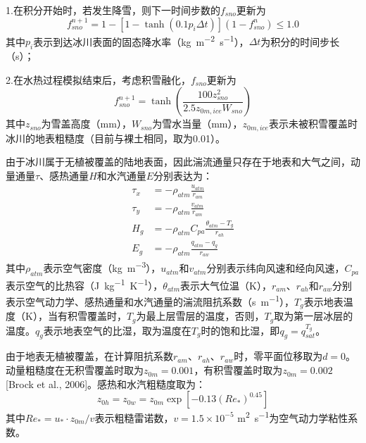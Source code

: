 1.在积分开始时，若发生降雪，则下一时间步数的$f_{sno}$更新为
\begin{equation}
    f^{n+1}_{sno}=1-\left[1-\tanh{\left(0.1 p_i \Delta t\right)}\right]\left(1-f^n_{sno}\right) \leqslant 1.0
\end{equation}
其中$p_i$表示到达冰川表面的固态降水率（\unit{kg.m^{-2}.s^{-1}}），$\Delta t$为积分的时间步长（s）；

2.在水热过程模拟结束后，考虑积雪融化，$f_{sno}$更新为
\begin{equation}
    f^{n+1}_{sno}=\tanh \left(\frac{100 z^2_{sno}}{2.5z_{0m,ice} W_{sno}}\right)
\end{equation}
其中$z_{sno}$为雪盖高度（mm），$W_{sno}$为雪水当量（mm），$z_{0m,ice}$表示未被积雪覆盖时冰川的地表粗糙度（目前与裸土相同，取为0.01）。


由于冰川属于无植被覆盖的陆地表面，因此湍流通量只存在于地表和大气之间，动量通量$\tau$、感热通量$H$和水汽通量$E$分别表达为：
\begin{align}
    \tau_x &= -\rho_{atm} \frac{u_{atm}}{r_{am}} \\
    \tau_y &= -\rho_{atm} \frac{v_{atm}}{r_{am}} \\
    H_g &= -\rho_{atm} C_{pa} \frac{\theta_{atm}-T_g}{r_{ah}} \\
    E_g &= -\rho_{atm} \frac{q_{atm}-q_g}{r_{aw}}
\end{align}
其中$\rho_{atm}$表示空气密度（\unit{kg.m^{-3}}），$u_{atm}$和$v_{atm}$分别表示纬向风速和经向风速，$C_{pa}$表示空气的比热容（\unit{J.kg^{-1}.K^{-1}}），$\theta_{atm}$表示大气位温（K），$r_{am}$、$r_{ah}$和$r_{aw}$分别表示空气动力学、感热通量和水汽通量的湍流阻抗系数（\unit{s.m^{-1}}），$T_g$表示地表温度（K），当有积雪覆盖时，$T_g$为最上层雪层的温度，否则，$T_g$取为第一层冰层的温度。$q_g$表示地表空气的比湿，取为温度在$T_g$时的饱和比湿，即$q_g=q^{T_g}_{sat}$。

由于地表无植被覆盖，在计算阻抗系数$r_{am}$、$r_{ah}$、$r_{aw}$时，零平面位移取为$d=0$。动量粗糙度在无积雪覆盖时取为$z_{0m}=0.001$，有积雪覆盖时取为$z_{0m}=0.002$ [Brock et al., 2006]。感热和水汽粗糙度取为：
\begin{equation}z_{0h}=z_{0w}=z_{0m}\exp{\left[-0.13\left(Re_*\right)^{0.45}\right]}
\end{equation}
其中$Re_*=u_*\cdot z_{0m}/v$表示粗糙雷诺数，$v= 1.5 \times 10^{-5}$ \unit{m^2.s^{-1}}为空气动力学粘性系数。

